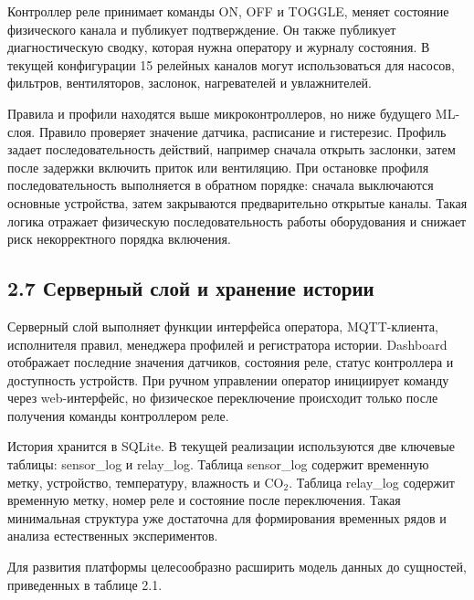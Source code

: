\documentclass[a4paper,14pt]{extarticle}
\renewcommand{\texttt}[1]{\textnormal{#1}}
\begin{document}
Контроллер реле принимает команды \texttt{ON}, \texttt{OFF} и
\texttt{TOGGLE}, меняет состояние физического канала и публикует
подтверждение. Он также публикует диагностическую сводку, которая нужна
оператору и журналу состояния. В текущей конфигурации 15 релейных
каналов могут использоваться для насосов, фильтров, вентиляторов,
заслонок, нагревателей и увлажнителей.

Правила и профили находятся выше микроконтроллеров, но ниже будущего
ML-слоя. Правило проверяет значение датчика, расписание и гистерезис.
Профиль задает последовательность действий, например сначала открыть
заслонки, затем после задержки включить приток или вентиляцию. При
остановке профиля последовательность выполняется в обратном порядке:
сначала выключаются основные устройства, затем закрываются
предварительно открытые каналы. Такая логика отражает физическую
последовательность работы оборудования и снижает риск некорректного
порядка включения.

\hypertarget{ux441ux435ux440ux432ux435ux440ux43dux44bux439-ux441ux43bux43eux439-ux438-ux445ux440ux430ux43dux435ux43dux438ux435-ux438ux441ux442ux43eux440ux438ux438}{%
\subsection{2.7 Серверный слой и хранение
истории}\label{ux441ux435ux440ux432ux435ux440ux43dux44bux439-ux441ux43bux43eux439-ux438-ux445ux440ux430ux43dux435ux43dux438ux435-ux438ux441ux442ux43eux440ux438ux438}}

Серверный слой выполняет функции интерфейса оператора, MQTT-клиента,
исполнителя правил, менеджера профилей и регистратора истории. Dashboard
отображает последние значения датчиков, состояния реле, статус
контроллера и доступность устройств. При ручном управлении оператор
инициирует команду через web-интерфейс, но физическое переключение
происходит только после получения команды контроллером реле.

История хранится в SQLite. В текущей реализации используются две
ключевые таблицы: \texttt{sensor\_log} и \texttt{relay\_log}. Таблица
\texttt{sensor\_log} содержит временную метку, устройство, температуру,
влажность и CO\(_2\). Таблица \texttt{relay\_log} содержит временную
метку, номер реле и состояние после переключения. Такая минимальная
структура уже достаточна для формирования временных рядов и анализа
естественных экспериментов.

Для развития платформы целесообразно расширить модель данных до
сущностей, приведенных в таблице 2.1.
\end{document}
